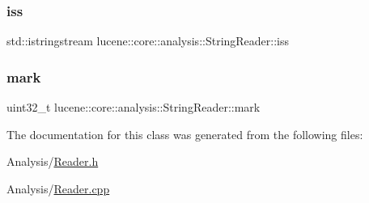 \subsubsection{\texorpdfstring{iss}{iss}}
{\footnotesize\ttfamily std\+::istringstream lucene\+::core\+::analysis\+::\+String\+Reader\+::iss\hspace{0.3cm}{\ttfamily [private]}}

\mbox{\label{classlucene_1_1core_1_1analysis_1_1StringReader_a9a5cc9672f77bed7c252145fbde69176}} 
\subsubsection{\texorpdfstring{mark}{mark}}
{\footnotesize\ttfamily uint32\+\_\+t lucene\+::core\+::analysis\+::\+String\+Reader\+::mark\hspace{0.3cm}{\ttfamily [private]}}



The documentation for this class was generated from the following files\+:\begin{DoxyCompactItemize}
\item 
Analysis/\mbox{\hyperlink{Reader_8h}{Reader.\+h}}\item 
Analysis/\mbox{\hyperlink{Reader_8cpp}{Reader.\+cpp}}\end{DoxyCompactItemize}
